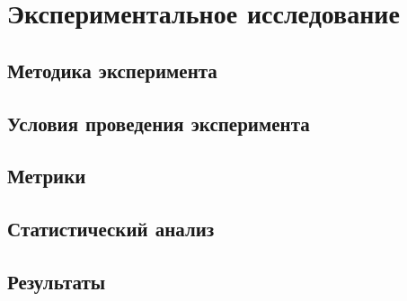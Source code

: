 \section{Экспериментальное исследование}
\thispagestyle{plain}


\subsection{Методика эксперимента}

\subsection{Условия проведения эксперимента}

\subsection{Метрики}

\subsection{Статистический анализ}

\subsection{Результаты}

